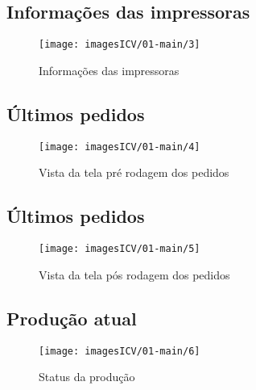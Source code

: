 \subsection{\small{Informações das impressoras}}

\begin{figure}
    \centering
    \texttt{[image: imagesICV/01-main/3]}
    \caption{Informações das impressoras}
    \label{fig:}
\end{figure}

\newpage
\thispagestyle{fancy}
\vspace{\fill}

\subsection{\small{Últimos pedidos}}

\begin{figure}
    \centering
    \texttt{[image: imagesICV/01-main/4]}
    \caption{Vista da tela pré rodagem dos pedidos}
    \label{fig:}
\end{figure}

\newpage
\thispagestyle{fancy}
\vspace{\fill}

\subsection{\small{Últimos pedidos}}

\begin{figure}
    \centering
    \texttt{[image: imagesICV/01-main/5]}
    \caption{Vista da tela pós rodagem dos pedidos}
    \label{fig:}
\end{figure}

\newpage
\thispagestyle{fancy}
\vspace{\fill}

\subsection{\small{Produção atual}}

\begin{figure}
    \centering
    \texttt{[image: imagesICV/01-main/6]}
    \caption{Status da produção}
    \label{fig:}
\end{figure}
